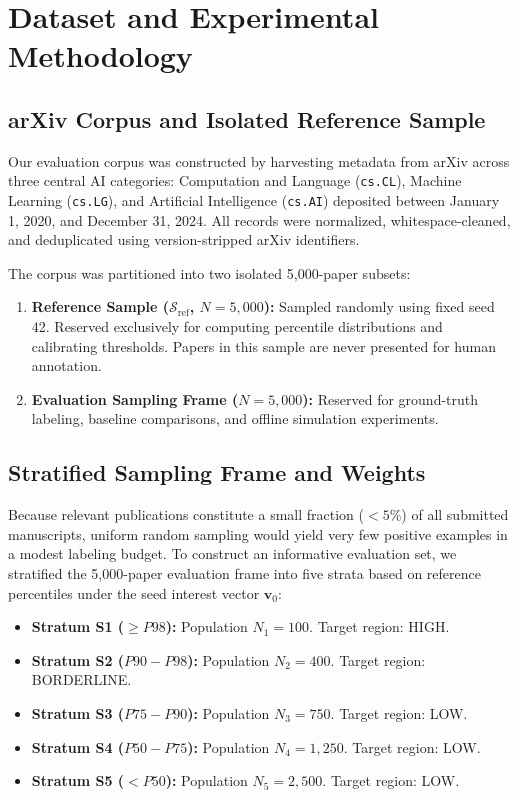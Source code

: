 \section{Dataset and Experimental Methodology}
\label{sec:dataset}

\subsection{arXiv Corpus and Isolated Reference Sample}
\label{sec:corpus}

Our evaluation corpus was constructed by harvesting metadata from arXiv across three central AI categories: Computation and Language (\texttt{cs.CL}), Machine Learning (\texttt{cs.LG}), and Artificial Intelligence (\texttt{cs.AI}) deposited between January 1, 2020, and December 31, 2024. All records were normalized, whitespace-cleaned, and deduplicated using version-stripped arXiv identifiers.

The corpus was partitioned into two isolated 5,000-paper subsets:
\begin{enumerate}
    \item \textbf{Reference Sample ($\mathcal{S}_{\text{ref}}$, $N = 5,000$):} Sampled randomly using fixed seed 42. Reserved exclusively for computing percentile distributions and calibrating thresholds. Papers in this sample are never presented for human annotation.
    \item \textbf{Evaluation Sampling Frame ($N = 5,000$):} Reserved for ground-truth labeling, baseline comparisons, and offline simulation experiments.
\end{enumerate}

\subsection{Stratified Sampling Frame and Weights}
\label{sec:stratification}

Because relevant publications constitute a small fraction ($< 5\%$) of all submitted manuscripts, uniform random sampling would yield very few positive examples in a modest labeling budget. To construct an informative evaluation set, we stratified the 5,000-paper evaluation frame into five strata based on reference percentiles under the seed interest vector $\mathbf{v}_0$:
\begin{itemize}
    \item \textbf{Stratum S1 ($\ge P98$):} Population $N_1 = 100$. Target region: HIGH.
    \item \textbf{Stratum S2 ($P90 - P98$):} Population $N_2 = 400$. Target region: BORDERLINE.
    \item \textbf{Stratum S3 ($P75 - P90$):} Population $N_3 = 750$. Target region: LOW.
    \item \textbf{Stratum S4 ($P50 - P75$):} Population $N_4 = 1,250$. Target region: LOW.
    \item \textbf{Stratum S5 ($< P50$):} Population $N_5 = 2,500$. Target region: LOW.
\end{itemize}

